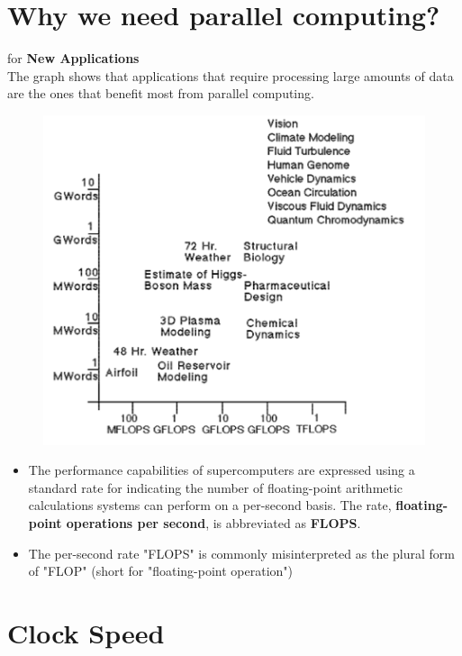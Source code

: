 \documentclass[12pt, a4paper]{book}
\begin{document}
\section{Why we need parallel computing?}
for \textbf{New Applications} \\
The graph shows that applications that require processing large amounts of data are the ones that benefit most from parallel computing.
\begin{figure}[h]
    \centering
    \includegraphics[width=0.7\linewidth]{figures/new-applications.png}
\end{figure}
\begin{itemize}
    \item The performance capabilities of supercomputers are expressed using a standard rate for indicating the number of floating-point arithmetic calculations systems can perform on a per-second basis. The rate, \textbf{floating-point operations per second}, is abbreviated as \textbf{FLOPS}.
    \item The per-second rate "FLOPS" is commonly misinterpreted as the plural form of "FLOP" (short for "floating-point operation") \cite{flops}
\end{itemize}
\section{Clock Speed}
\end{document}
